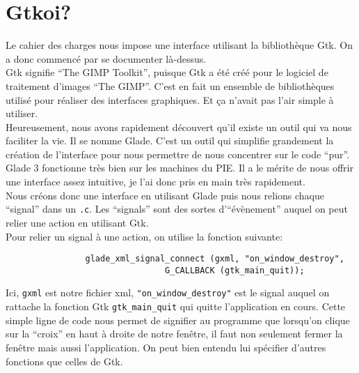 \documentclass[]{report}
\begin{document}
		
		\section{Gtkoi?} %
		\label{sec:gtkoi_}
			Le cahier des charges nous impose une interface utilisant la biblioth\`eque Gtk. On a donc commenc\'e par se documenter l\`a-dessus.\\
			Gtk signifie ``The GIMP Toolkit'', puisque Gtk a \'et\'e cr\'e\'e pour le logiciel de traitement d'images ``The GIMP''. C'est en fait un ensemble de biblioth\`eques utilis\'e pour r\'ealiser des interfaces graphiques. Et \c ca n'avait pas l'air simple \`a utiliser.\\
			Heureusement, nous avons rapidement d\'ecouvert qu'il existe un outil qui va nous faciliter la vie. Il se nomme Glade. C'est un outil qui simplifie grandement la cr\'eation de l'interface pour nous permettre de nous concentrer sur le code ``pur''. Glade 3 fonctionne tr\`es bien sur les machines du PIE. Il a le m\'erite de nous offrir une interface assez intuitive, je l'ai donc pris en main tr\`es rapidement.\\
			Nous cr\'eons donc une interface en utilisant Glade puis nous relions chaque ``signal'' dans un \texttt{.c}. Les ``signals'' sont des sortes d'``\'ev\`enement'' auquel on peut relier une action en utilisant Gtk.\\
			Pour relier un signal \`a une action, on utilise la fonction suivante:

			\begin{verbatim}
				glade_xml_signal_connect (gxml, "on_window_destroy",
							    G_CALLBACK (gtk_main_quit));
			\end{verbatim}

			Ici, \verb!gxml! est notre fichier xml, \verb!"on_window_destroy"! est le signal auquel on rattache la fonction Gtk \verb!gtk_main_quit! qui quitte l'application en cours. Cette simple ligne de code nous permet de signifier au programme que lorsqu'on clique sur la ``croix'' en haut \`a droite de notre fen\^etre, il faut non seulement fermer la fen\^etre mais aussi l'application.
			On peut bien entendu lui sp\'ecifier d'autres fonctions que celles de Gtk.

\end{document}
